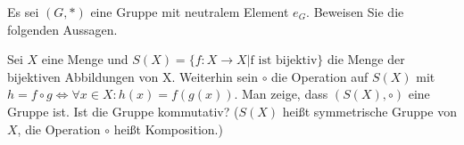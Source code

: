 \documentclass[10pt, a4paper]{exam}
\begin{document}
\begin{questions}

    \question Es sei $(G, \ast)$ eine Gruppe mit neutralem Element $e_G$. Beweisen Sie die folgenden Aussagen.

    \question Sei $X$ eine Menge und $S(X)=\{f: X\rightarrow X | \text{f ist bijektiv}\}$ die Menge der bijektiven Abbildungen von X. Weiterhin sein $\circ$ die Operation auf $S(X)$ mit $h=f\circ g \Leftrightarrow\forall x\in X: h(x) = f(g(x))$.
    Man zeige, dass $(S(X),\circ)$ eine Gruppe ist. Ist die Gruppe kommutativ? ($S(X)$ heißt
    symmetrische Gruppe von $X$, die Operation $\circ$ heißt Komposition.)
    \begin{solution}
    \end{solution}


\end{questions}
\end{document}
